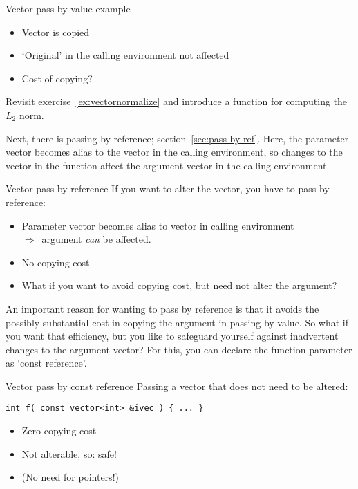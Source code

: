 \begin{block}{Vector pass by value example}
  \label{sl:vector-arg-ex}
  \begin{itemize}
  \item Vector is copied
  \item `Original' in the calling environment not affected
  \item Cost of copying?
  \end{itemize}
\end{block}

\begin{exercise}
  \label{ex:vectornormalize-function}
  Revisit exercise~\ref{ex:vectornormalize} and introduce a function
  for computing the $L_2$ norm.
\end{exercise}

Next, there is passing by reference; section~\ref{sec:pass-by-ref}.
Here, the parameter vector becomes alias to the vector in the calling environment,
so changes to the vector in the function affect the argument vector
in the calling environment.



\begin{slide}{Vector pass by reference}
  \label{sl:vector-arg-ref}
  If you want to alter the vector, you have to pass by reference:
  \begin{itemize}
  \item Parameter vector becomes alias to vector in calling environment\\
    $\Rightarrow$~argument \emph{can} be affected.
  \item No copying cost
  \item What if you want to avoid copying cost, but need not alter the argument?
  \end{itemize}
\end{slide}

An important reason for wanting to pass by reference is that it avoids
the possibly substantial cost in copying the argument in passing by value.
So what if you want that efficiency, but you like to safeguard yourself
against inadvertent changes to the argument vector?
For this, you can declare the function parameter as `const reference'.

\begin{block}{Vector pass by const reference}
  \label{sl:vector-const-ref}
  Passing a vector that does not need to be altered:
\begin{lstlisting}
int f( const vector<int> &ivec ) { ... }    
\end{lstlisting}
\begin{itemize}
\item Zero copying cost
\item Not alterable, so: safe!
\item (No need for pointers!)
\end{itemize}
\end{block}

